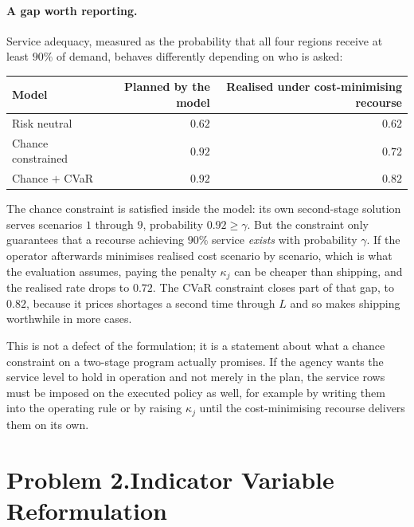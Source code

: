 \documentclass[11pt]{article}
\theoremstyle{definition}\newtheorem*{definition}{Definition}
\theoremstyle{definition}
\begin{document}
\paragraph{A gap worth reporting.} Service adequacy, measured as the
probability that all four regions receive at least $90\%$ of demand,
behaves differently depending on who is asked:

\begin{center}
\begin{tabular}{@{}lrr@{}}
\toprule
Model & Planned by the model & Realised under cost-minimising recourse \\
\midrule
Risk neutral       & $0.62$ & $0.62$ \\
Chance constrained & $0.92$ & $0.72$ \\
Chance $+$ CVaR    & $0.92$ & $0.82$ \\
\bottomrule
\end{tabular}
\end{center}

The chance constraint is satisfied inside the model: its own
second-stage solution serves scenarios $1$ through $9$, probability
$0.92 \ge \gamma$. But the constraint only guarantees that a recourse
achieving $90\%$ service \emph{exists} with probability $\gamma$. If the
operator afterwards minimises realised cost scenario by scenario, which
is what the evaluation assumes, paying the penalty $\kappa_j$ can be
cheaper than shipping, and the realised rate drops to $0.72$. The CVaR
constraint closes part of that gap, to $0.82$, because it prices
shortages a second time through $L$ and so makes shipping worthwhile in
more cases.

This is not a defect of the formulation; it is a statement about what a
chance constraint on a two-stage program actually promises. If the agency
wants the service level to hold in operation and not merely in the plan,
the service rows must be imposed on the executed policy as well, for
example by writing them into the operating rule or by raising $\kappa_j$
until the cost-minimising recourse delivers them on its own.

\newpage
\section*{Problem 2.\quad Indicator Variable Reformulation \quad[25 pts]}
\end{document}
